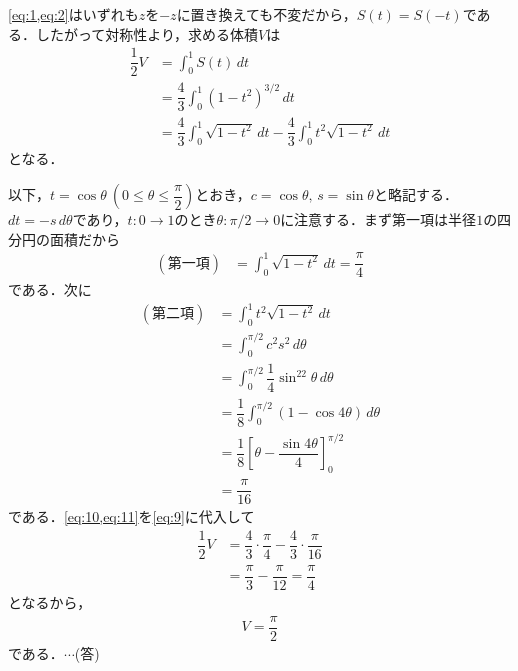 \documentclass[../../main.tex]{subfiles}
\begin{document}
\cref{eq:1,eq:2}はいずれも$z$を$-z$に置き換えても不変だから，$S(t)=S(-t)$である．したがって対称性より，求める体積$V$は
\begin{align}
  \dfrac{1}{2}V
  &=\int_0^1 S(t)\,dt \\
  &=\dfrac{4}{3}\int_0^1(1-t^2)^{3/2}\,dt \\
  &=\dfrac{4}{3}\int_0^1\sqrt{1-t^2}\,dt-\dfrac{4}{3}\int_0^1t^2\sqrt{1-t^2}\,dt \label{eq:9}
\end{align}
となる．

以下，$t=\cos\theta\ \left(0\le\theta\le\dfrac{\pi}{2}\right)$とおき，$c=\cos\theta,\,s=\sin\theta$と略記する．$dt=-s\,d\theta$であり，$t:0\to1$のとき$\theta:\pi/2\to0$に注意する．まず第一項は半径$1$の四分円の面積だから
\begin{align}
  (\text{第一項})
  &=\int_0^1\sqrt{1-t^2}\,dt
  =\dfrac{\pi}{4} \label{eq:10}
\end{align}
である．次に
\begin{align}
  (\text{第二項})
  &=\int_0^1t^2\sqrt{1-t^2}\,dt \\
  &=\int_0^{\pi/2}c^2s^2\,d\theta \\
  &=\int_0^{\pi/2}\dfrac{1}{4}\sin^22\theta\,d\theta \\
  &=\dfrac{1}{8}\int_0^{\pi/2}(1-\cos4\theta)\,d\theta \\
  &=\dfrac{1}{8}\left[\theta-\dfrac{\sin4\theta}{4}\right]_0^{\pi/2} \\
  &=\dfrac{\pi}{16} \label{eq:11}
\end{align}
である．\cref{eq:10,eq:11}を\cref{eq:9}に代入して
\begin{align}
  \dfrac{1}{2}V
  &=\dfrac{4}{3}\cdot\dfrac{\pi}{4}-\dfrac{4}{3}\cdot\dfrac{\pi}{16} \\
  &=\dfrac{\pi}{3}-\dfrac{\pi}{12}
  =\dfrac{\pi}{4}
\end{align}
となるから，
\begin{align}
  V=\dfrac{\pi}{2}
\end{align}
である．$\cdots$(答)

\end{document}

